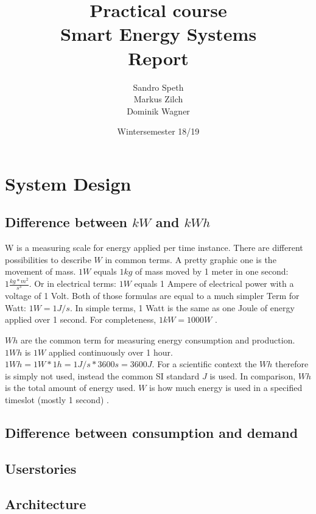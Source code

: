\documentclass[12pt]{scrartcl}
\title{Practical course
\\ Smart Energy Systems\\
	Report}
\date{Wintersemester 18/19}
\author{Sandro Speth\\
Markus Zilch\\
Dominik Wagner}
\begin{document}
\maketitle


\section{System Design}\label{sec:systemdesign}

\subsection{Difference between $kW$ and $kWh$}\label{sec:diffEnergy}
W is a measuring scale for energy applied per time instance.
There are different possibilities to describe $W$ in common terms.
A pretty graphic one is the movement of mass.
$1W$ equals $1kg$ of mass moved by 1 meter in one second: $1 \frac{kg*m^2}{s^3}$.
Or in electrical terms: $1W$ equals 1 Ampere of electrical power with a voltage of 1 Volt.
Both of those formulas are equal to a much simpler Term for Watt: $1 W = 1 J/s$.
In simple terms, 1 Watt is the same as one Joule of energy applied over 1 second.
For completeness, $1kW = 1000 W$ \cite{Nelson,Borvon,SIStandard}.

$Wh$ are the common term for measuring energy consumption and production.
$1Wh$ is $1W$ applied continuously over 1 hour.
$1Wh = 1 W * 1h = 1 J/s * 3600s = 3600J$.
For a scientific context the $Wh$ therefore is simply not used, instead the common SI standard $J$ is used.
In comparison, $Wh$ is the total amount of energy used. $W$ is how much energy is used in a specified timeslot (mostly 1 second) \cite{EURichtlinie,Bundesgesetz}.


\subsection{Difference between consumption and demand}\label{sec:diffconsumptiondemand}



\subsection{Userstories}\label{sec:userstories}


\subsection{Architecture}

\end{document}
